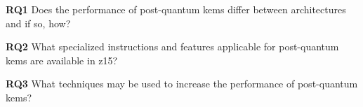 \begin{description}
    \item \textbf{RQ1} Does the performance of \gls{post-quantum} \glspl{kem} differ between architectures and if so, how?\label{rq1}
    
    \item \textbf{RQ2} What specialized instructions and features applicable for \gls{post-quantum} \glspl{kem} are available in \gls{z15}?\label{rq2}
    
    \item \textbf{RQ3} What techniques may be used to increase the performance of \gls{post-quantum} \glspl{kem}?\label{rq3}
\end{description}


